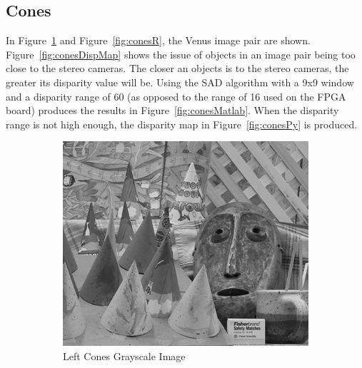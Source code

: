 \subsection{Cones}
\label{sec:cones}

In Figure~\ref{fig:conesL} and Figure~\ref{fig:conesR}, the Venus image pair are shown. Figure~\ref{fig:conesDispMap} shows the issue of objects in an image pair being too close to the stereo cameras. The closer an objects is to the stereo cameras, the greater its disparity value will be. Using the SAD algorithm with a 9x9 window and a disparity range of 60 (as opposed to the range of 16 used on the FPGA board) produces the results in Figure~\ref{fig:conesMatlab}. When the disparity range is not high enough, the disparity map in Figure~\ref{fig:conesPy} is produced.

\begin{figure}
\begin{center}
	\begin{subfigure}{0.45\textwidth}
		\includegraphics[width=\textwidth]{figures/conesL.png}
		\caption{Left Cones Grayscale Image}
		\label{fig:conesL}
	\end{subfigure}
	\begin{subfigure}{0.45\textwidth}

\end{subfigure}
\end{center}
\end{figure}
